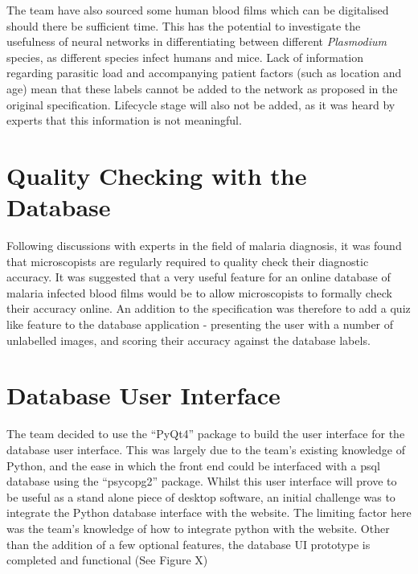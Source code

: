 \documentclass[a4paper,11pt]{article}
\begin{document}
The team have also sourced some human blood films which can be digitalised should there be sufficient time. This
has the potential to investigate the usefulness of neural networks in
differentiating between different \emph{Plasmodium} species, as different species infect humans and mice. Lack of information regarding parasitic load and accompanying patient
factors (such as location and age) mean that these labels cannot be added to the
network as proposed in the original specification. Lifecycle stage
will also not be added, as it was heard by experts that this
information is not meaningful.

\section{Quality Checking with the Database}
Following discussions with experts in the field of malaria diagnosis,
it was found that microscopists are regularly required to quality check their
diagnostic accuracy. It was suggested that a very useful feature for
an online database of malaria infected blood films would be to allow
microscopists to formally check their accuracy online. An addition to
the specification was therefore to add a quiz like feature to the
database application - presenting the user with a number of unlabelled
images, and scoring their accuracy against the database labels.

\section{Database User Interface}
The team decided to use the ``PyQt4'' package to build the user interface
for the database user interface. This was largely due to the team's
existing knowledge of Python, and the ease in which the front end
could be interfaced with a psql database using the ``psycopg2''
package. Whilst this user interface will prove to be useful as a stand
alone piece of desktop software, an initial challenge was to integrate the
Python database interface with the website. The limiting factor here
was the team's knowledge of how to integrate python with the website. Other than the addition of a few optional features, the database UI prototype is completed and functional (See Figure X)
\end{document}
